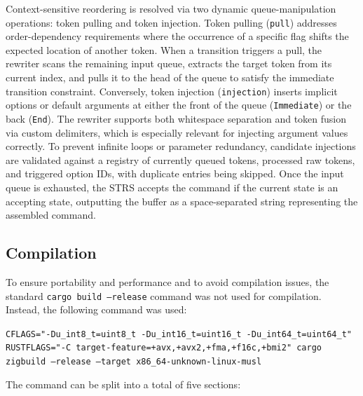Context-sensitive reordering is resolved via two dynamic queue-manipulation operations: token pulling and token injection. Token pulling (\texttt{pull}) addresses order-dependency requirements where the occurrence of a specific flag shifts the expected location of another token. When a transition triggers a pull, the rewriter scans the remaining input queue, extracts the target token from its current index, and pulls it to the head of the queue to satisfy the immediate transition constraint. Conversely, token injection (\texttt{injection}) inserts implicit options or default arguments at either the front of the queue (\texttt{Immediate}) or the back (\texttt{End}). The rewriter supports both whitespace separation and token fusion via custom delimiters, which is especially relevant for injecting argument values correctly. To prevent infinite loops or parameter redundancy, candidate injections are validated against a registry of currently queued tokens, processed raw tokens, and triggered option IDs, with duplicate entries being skipped. Once the input queue is exhausted, the \ac{STRS} accepts the command if the current state is an accepting state, outputting the buffer as a space-separated string representing the assembled command.

\subsection{Compilation}

To ensure portability and performance and to avoid compilation issues, the standard \texttt{cargo build --release} command was not used for compilation. Instead, the following command was used:

\texttt{CFLAGS="-Du\_int8\_t=uint8\_t -Du\_int16\_t=uint16\_t -Du\_int64\_t=uint64\_t" RUSTFLAGS="-C target-feature=+avx,+avx2,+fma,+f16c,+bmi2" cargo zigbuild --release --target x86\_64-unknown-linux-musl}

The command can be split into a total of five sections:


